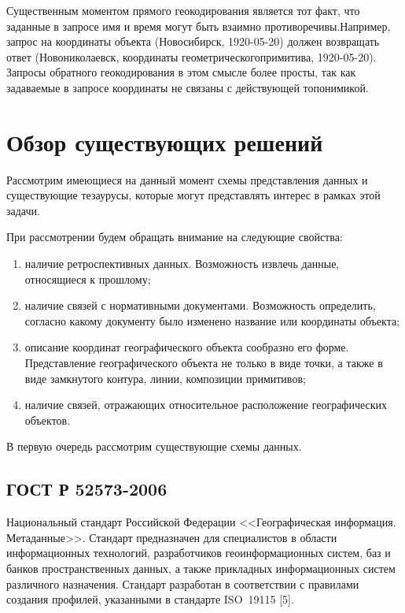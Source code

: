 \begin{multicols}{2}
  Существенным моментом прямого геокодирования является тот факт, что заданные в 
запросе имя и время могут быть взаимно противоречивы.\linebreak Например, запрос на координаты 
объекта (Новосибирск, 1920-05-20) должен возвращать ответ (Новониколаевск, {координаты 
геометрического\linebreak примитива}, 1920-05-20). Запросы обратного геокодирования в этом 
смысле более просты, так как задаваемые в запросе координаты не связаны с действующей 
топонимикой.
  
  \section{Обзор существующих решений}
  
  Рассмотрим имеющиеся на данный момент схемы представления данных и существующие 
тезаурусы, которые могут представлять интерес в рамках этой задачи.
  
  При рассмотрении будем обращать внимание на следующие свойства:
  \begin{enumerate}[(1)]
\item наличие ретроспективных данных. Возможность извлечь данные, относящиеся к 
прошлому;\\[-14pt]
\item наличие связей с нормативными документами. Возможность определить, 
согласно какому документу было изменено название или координаты объекта;
\\[-14pt]
\item описание координат географического объекта сообразно его форме. Представление 
географического объекта не только в виде точки, а также в виде замкнутого контура, линии, 
композиции примитивов;\\[-14pt]
\item наличие связей, отражающих относительное расположение географических 
объектов.
\end{enumerate}

   В первую очередь рассмотрим существующие схемы данных.
   
   \vspace*{-6pt}

  \subsection{ГОСТ Р 52573-2006}
  
  Национальный стандарт Российской Федерации <<Географическая информация. 
Метаданные>>. Стандарт предназначен для специалистов в области информационных 
технологий, разработчиков геоинформационных систем, баз и банков пространственных 
данных, а также прикладных информационных систем различного назначения. Стандарт 
разработан в соответствии с правилами создания профилей, указанными в стандарте 
{ISO}~19115 [5].
  

\end{multicols}
